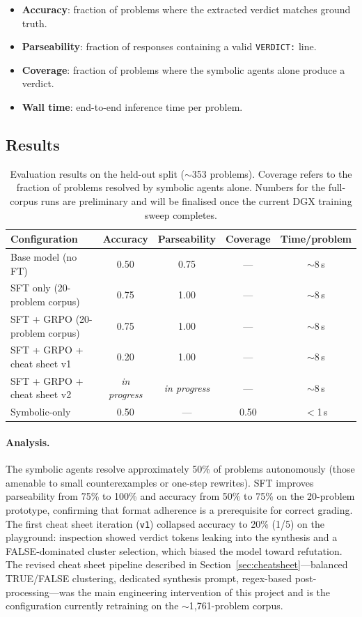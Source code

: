 \documentclass{article}
\begin{document}
\begin{itemize}[itemsep=1pt]
  \item \textbf{Accuracy}: fraction of problems where the extracted verdict matches ground truth.
  \item \textbf{Parseability}: fraction of responses containing a valid \texttt{VERDICT:} line.
  \item \textbf{Coverage}: fraction of problems where the symbolic agents alone produce a verdict.
  \item \textbf{Wall time}: end-to-end inference time per problem.
\end{itemize}

\subsection{Results}

\begin{table}[h]
  \caption{Evaluation results on the held-out split ($\sim$353 problems). Coverage refers to the fraction of problems resolved by symbolic agents alone. Numbers for the full-corpus runs are preliminary and will be finalised once the current DGX training sweep completes.}
  \label{tab:results}
  \centering
  \begin{tabular}{lcccc}
    \toprule
    Configuration & Accuracy & Parseability & Coverage & Time/problem \\
    \midrule
    Base model (no FT) & 0.50 & 0.75 & --- & $\sim$8\,s \\
    SFT only (20-problem corpus) & 0.75 & 1.00 & --- & $\sim$8\,s \\
    SFT + GRPO (20-problem corpus) & 0.75 & 1.00 & --- & $\sim$8\,s \\
    SFT + GRPO + cheat sheet v1 & 0.20 & 1.00 & --- & $\sim$8\,s \\
    SFT + GRPO + cheat sheet v2 & \textit{in progress} & \textit{in progress} & --- & $\sim$8\,s \\
    Symbolic-only & 0.50 & --- & 0.50 & $<$1\,s \\
    \bottomrule
  \end{tabular}
\end{table}

\paragraph{Analysis.} The symbolic agents resolve approximately 50\% of problems autonomously (those amenable to small counterexamples or one-step rewrites). SFT improves parseability from 75\% to 100\% and accuracy from 50\% to 75\% on the 20-problem prototype, confirming that format adherence is a prerequisite for correct grading. The first cheat sheet iteration (\texttt{v1}) collapsed accuracy to 20\% (1/5) on the playground: inspection showed verdict tokens leaking into the synthesis and a FALSE-dominated cluster selection, which biased the model toward refutation. The revised cheat sheet pipeline described in Section~\ref{sec:cheatsheet}---balanced TRUE/FALSE clustering, dedicated synthesis prompt, regex-based post-processing---was the main engineering intervention of this project and is the configuration currently retraining on the $\sim$1{,}761-problem corpus.
\end{document}
